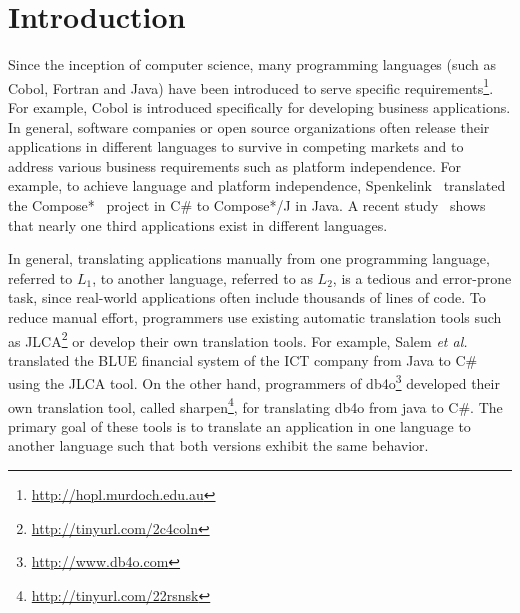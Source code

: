 \section{Introduction}
\label{sec:introduction}

Since the inception of computer science, many programming languages (such as Cobol, Fortran and Java) have been introduced to serve specific requirements\footnote{\url{http://hopl.murdoch.edu.au}}. For example, Cobol is introduced specifically for developing business applications. In general, software companies or open source organizations often release their applications in different languages to survive in competing markets and to address various business requirements such as platform independence. For example, to achieve language and platform independence, Spenkelink~\cite{spenkelink2007porting} translated the Compose*~\cite{garcia-compose} project in C\# to Compose*/J in Java. A recent study~\cite{jones1998estimating} shows that nearly one third applications exist in different languages.

In general, translating applications manually from one programming language, referred to $L_1$, to another language, referred to as $L_2$, is a tedious and error-prone task, since real-world applications often include thousands of lines of code. To reduce manual effort, programmers use existing automatic translation tools such as JLCA\footnote{\url{http://tinyurl.com/2c4coln}} or develop their own translation tools. For example, Salem \emph{et al.}~\cite{AgtashAEMBS06} translated the BLUE financial system of the ICT company from Java to C\# using the JLCA tool. On the other hand, programmers of db4o\footnote{\url{http://www.db4o.com}} developed their own translation tool, called sharpen\footnote{\url{http://tinyurl.com/22rsnsk}}, for translating db4o from java to C\#. The primary goal of these tools is to translate an application in one language to another language such that both versions exhibit the same behavior.

